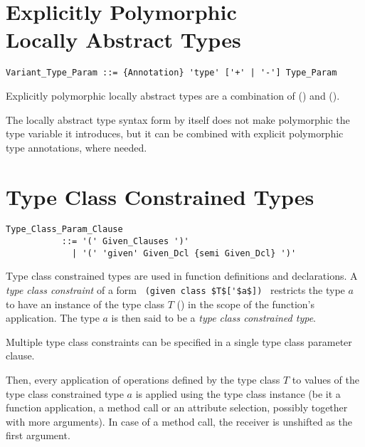 \section[Explicitly Polymorphic Locally Abstract Types]{Explicitly Polymorphic \\ Locally Abstract Types}
\label{sec:locally-abstract-polymorphic-types}

\syntax\begin{lstlisting}
Variant_Type_Param ::= {Annotation} 'type' ['+' | '-'] Type_Param
\end{lstlisting}

Explicitly polymorphic locally abstract types are a combination of () and ().

The locally abstract type syntax form by itself does not make polymorphic the type variable it introduces, but it can be combined with explicit polymorphic type annotations, where needed. 





\section{Type Class Constrained Types}
\label{sec:type-class-constrained-types}

\syntax\begin{lstlisting}
Type_Class_Param_Clause 
           ::= '(' Given_Clauses ')'
             | '(' 'given' Given_Dcl {semi Given_Dcl} ')'
\end{lstlisting}

Type class constrained types are used in function definitions and declarations. A {\em type class constraint} of a form ~\lstinline!(given class $T$['$a$])!~ restricts the type $a$ to have an instance of the type class $T$ () in the scope of the function's application. The type $a$ is then said to be a {\em type class constrained type}. 

Multiple type class constraints can be specified in a single type class parameter clause. 

Then, every application of operations defined by the type class $T$ to values of the type class constrained type $a$ is applied using the type class instance (be it a function application, a method call or an attribute selection, possibly together with more arguments). In case of a method call, the receiver is unshifted as the first argument.  

